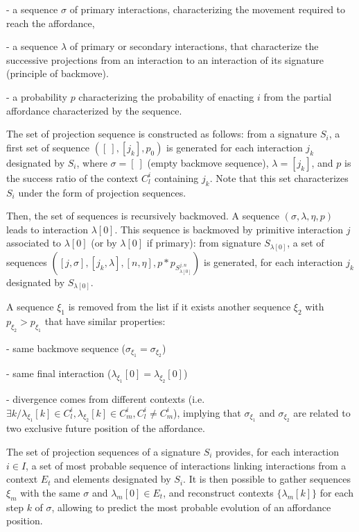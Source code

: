 \documentclass[conference]{IEEEtran}
\begin{document}
- a sequence $\sigma$ of primary interactions, characterizing the movement required to reach the affordance,

- a sequence $\lambda$ of primary or secondary interactions, that characterize the successive projections from an interaction to an interaction of its signature (principle of backmove).

- a probability $p$ characterizing the probability of enacting $i$ from the partial affordance characterized by the sequence.


The set of projection sequence is constructed as follows: from a signature $S_i$, a first set of sequence $([\:], [j_k], p_0)$ is generated for each interaction $j_k$ designated by $S_i$, where $\sigma=[\: ]$ (empty backmove sequence), $\lambda=[j_k]$,
and $p$ is the success ratio of the context $C_l^i$ containing $j_k$. Note that this set characterizes $S_i$ under the form of projection sequences.

Then, the set of sequences is recursively backmoved. A sequence $(\sigma, \lambda, \eta, p)$ leads to interaction $\lambda[0]$. This sequence is backmoved by primitive interaction $j$ associated to $\lambda[0]$ (or by $\lambda[0]$ if primary): from signature $S_{\lambda[0]}$, a set of sequences $([j,\sigma], [j_k,\lambda], [n,\eta], p*p_{S_{\lambda[0]}^{j,n}})$ is generated, for each interaction $j_k$ designated by $S_{\lambda[0]}$.

A sequence $\xi_1$ is removed from the list if it exists another sequence $\xi_2$ with $p_{\xi_2}>p_{\xi_1}$ that have similar properties:

- same backmove sequence ($\sigma_{\xi_1}=\sigma_{\xi_2}$)

- same final interaction ($\lambda_{\xi_1}[0]=\lambda_{\xi_2}[0]$)

- divergence comes from different contexts (i.e. $\exists k / \lambda_{\xi_1}[k] \in C_l^i, \lambda_{\xi_2}[k] \in C_m^i, C_l^i \neq C_m^i$), implying that $\sigma_{\xi_1}$ and $\sigma_{\xi_2}$  are related to two exclusive future position of the affordance. %

The set of projection sequences of a signature $S_i$ provides, for each interaction $i \in I$, a set of most probable sequence of interactions linking interactions from a context $E_t$ and elements designated by $S_i$.
It is then possible to gather sequences $\xi_m$ with the same $\sigma$ and $\lambda_m[0]\in E_t$, and reconstruct contexts $\{\lambda_m[k]\}$ for each step $k$ of $\sigma$, allowing to predict the most probable evolution of an affordance position.
\end{document}

